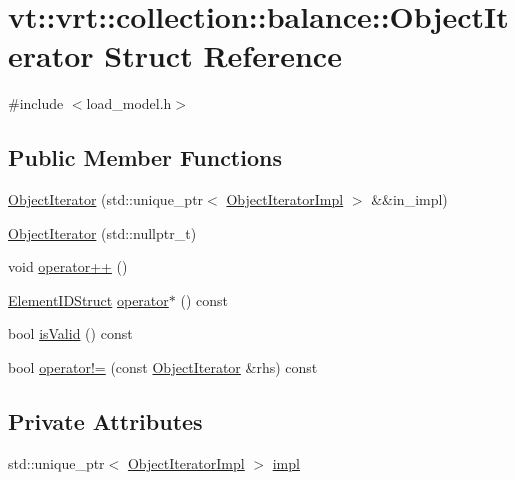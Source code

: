 \hypertarget{structvt_1_1vrt_1_1collection_1_1balance_1_1_object_iterator}{}\section{vt\+:\+:vrt\+:\+:collection\+:\+:balance\+:\+:Object\+Iterator Struct Reference}
\label{structvt_1_1vrt_1_1collection_1_1balance_1_1_object_iterator}


{\ttfamily \#include $<$load\+\_\+model.\+h$>$}

\subsection*{Public Member Functions}
\begin{DoxyCompactItemize}
\item 
\hyperlink{structvt_1_1vrt_1_1collection_1_1balance_1_1_object_iterator_a059d6516aa6a1e01a7580d51d551db91}{Object\+Iterator} (std\+::unique\+\_\+ptr$<$ \hyperlink{structvt_1_1vrt_1_1collection_1_1balance_1_1_object_iterator_impl}{Object\+Iterator\+Impl} $>$ \&\&in\+\_\+impl)
\item 
\hyperlink{structvt_1_1vrt_1_1collection_1_1balance_1_1_object_iterator_ae04e995ab1ae05140c98db4280c3b93d}{Object\+Iterator} (std\+::nullptr\+\_\+t)
\item 
void \hyperlink{structvt_1_1vrt_1_1collection_1_1balance_1_1_object_iterator_a22189471c74df1c8c1a29edf6f659244}{operator++} ()
\item 
\hyperlink{namespacevt_1_1vrt_1_1collection_1_1balance_a9f5b53fafb270212279a4757d2c4cd28}{Element\+I\+D\+Struct} \hyperlink{structvt_1_1vrt_1_1collection_1_1balance_1_1_object_iterator_a501c99951426eeaa29971c50118c30d0}{operator$\ast$} () const
\item 
bool \hyperlink{structvt_1_1vrt_1_1collection_1_1balance_1_1_object_iterator_af4dba6c74f33c10c7a16b24d0ec7e5bf}{is\+Valid} () const
\item 
bool \hyperlink{structvt_1_1vrt_1_1collection_1_1balance_1_1_object_iterator_a9ab504d3cb9a769928f21dfe804844fb}{operator!=} (const \hyperlink{structvt_1_1vrt_1_1collection_1_1balance_1_1_object_iterator}{Object\+Iterator} \&rhs) const
\end{DoxyCompactItemize}
\subsection*{Private Attributes}
\begin{DoxyCompactItemize}
\item 
std\+::unique\+\_\+ptr$<$ \hyperlink{structvt_1_1vrt_1_1collection_1_1balance_1_1_object_iterator_impl}{Object\+Iterator\+Impl} $>$ \hyperlink{structvt_1_1vrt_1_1collection_1_1balance_1_1_object_iterator_abe8e8b725eca54696504c22edba21922}{impl}
\end{DoxyCompactItemize}


